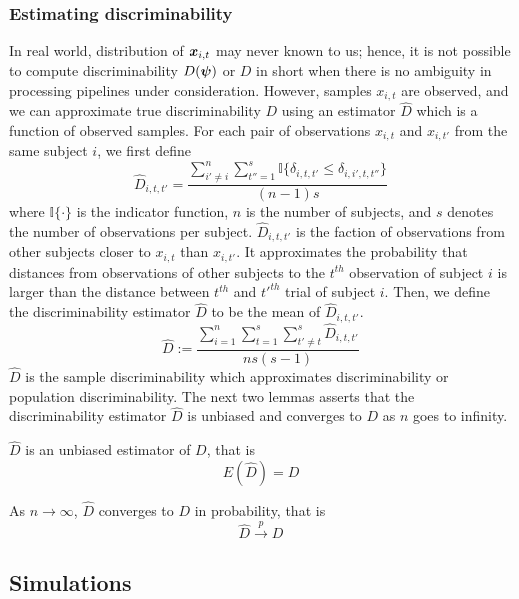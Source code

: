 \documentclass{article}
\begin{document}
\subsubsection{Estimating discriminability}
In real world, distribution of $\boldsymbol{x}_{i,t}$ may never known to us; hence, it is not possible to compute discriminability $D(\boldsymbol{\psi})$ or $D$ in short when there is no ambiguity in processing pipelines under consideration. However, samples $x_{i,t}$ are observed, and we can approximate true discriminability $D$ using an estimator $\hat{D}$ which is a function of observed samples. For each pair of observations $x_{i,t}$ and $x_{i,t'}$ from the same subject $i$, we first define
\[ \hat{D}_{i,t,t'} = \frac{\sum\limits_{i' \neq i}^{n} \sum\limits_{t''=1}^{s} \mathbb{I}\{\delta_{i,t,t'} \leq \delta_{i,i',t,t''} \} }{(n-1)s}\]
where $\mathbb{I}\{ \cdot \} $ is the indicator function, $n$ is the number of subjects, and $s$ denotes the number of observations per subject. $\hat{D}_{i,t,t'}$ is the faction of observations from other subjects closer to $x_{i,t}$ than $x_{i,t'}$. It approximates the probability that distances from observations of other subjects to the $t^{th}$ observation of subject $i$ is larger than the distance between $t^{th}$ and $t'^{th}$ trial of subject $i$. Then, we define the discriminability estimator $\hat{D}$ to be the mean of $\hat{D}_{i,t,t'}$.
\[ \hat{D} := \frac{\sum\limits_{i=1}^{n} \sum\limits_{t=1}^{s}  \sum\limits_{t' \neq t}^{s} \hat{D}_{i,t,t'}}{ns(s-1)} \]
$\hat{D}$ is the sample discriminability which approximates discriminability or population discriminability. The next two lemmas asserts that the discriminability estimator $\hat{D}$ is unbiased and converges to $D$ as $n$ goes to infinity.

\begin{lem}	
	$\hat{D}$ is an unbiased estimator of $D$, that is
	\[ E(\hat{D}) = D\]
\end{lem}

\begin{lem}	
	As $n \rightarrow \infty$, $\hat{D}$ converges to $D$ in probability, that is
	\[\hat{D} \overset{p}{\rightarrow} D \]
\end{lem}



\subsection{Simulations}
\end{document}
